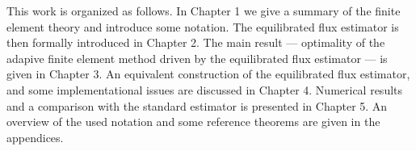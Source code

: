 \documentclass[thesis.tex]{subfiles}
\begin{document}

This work is organized as follows.
In Chapter 1 
we give a summary of the finite element theory and introduce some notation. The equilibrated flux estimator is then formally introduced 
in Chapter 2. The main result --- optimality of the adapive finite element method driven by the equilibrated flux estimator --- is 
given in Chapter 3.
 An equivalent construction of the equilibrated flux estimator, and some implementational issues are discussed in Chapter 4. Numerical results and a comparison with the standard estimator is presented
in Chapter 5. An overview of the used notation and some reference theorems are given in the appendices. 
\end{document}
